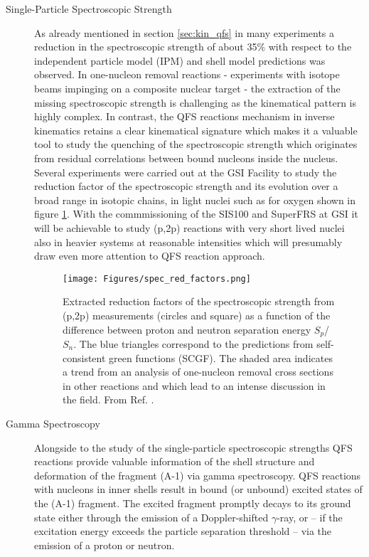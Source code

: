 \begin{description}
\item[Single-Particle Spectroscopic Strength]As already mentioned in section \ref{sec:kin_qfs} in many experiments a reduction in the spectroscopic strength of about 35\% with respect to the independent particle model (IPM) and shell model predictions was observed. In one-nucleon removal reactions - experiments with isotope beams impinging on a composite nuclear target - the extraction of the missing spectroscopic strength is challenging as the kinematical pattern is highly complex. In contrast, the QFS reactions mechanism in inverse kinematics retains a clear kinematical signature which makes it a valuable tool to study the quenching of the spectroscopic strength which originates from residual correlations between bound nucleons inside the nucleus. \newline
Several experiments were carried out at the GSI Facility to study the reduction factor of the spectroscopic strength  and its evolution over a broad range in isotopic chains, in light nuclei such as for oxygen shown in figure \ref{fig:red_factor}. With the commmissioning of the SIS100 and SuperFRS at GSI it will be achievable to study (p,2p) reactions with very short lived nuclei also in heavier systems at reasonable intensities which will presumably draw even more attention to QFS reaction approach.  
\begin{figure}[htpb]
    \centering
    \texttt{[image: Figures/spec\_red\_factors.png]}
    \caption{
   	Extracted reduction factors of the spectroscopic strength from (p,2p) measurements (circles and square) as a function of the difference between proton and neutron separation energy $S_p$/$S_n$. The blue triangles correspond to the predictions from self-consistent green functions (SCGF). The shaded area indicates a trend from an analysis of one-nucleon removal cross sections in other reactions and which lead to an intense discussion in the field. From Ref. \cite{atar2018quasifree}.   
    }
    \label{fig:red_factor}
\end{figure}
\item[Gamma Spectroscopy]Alongside to the study of the single-particle spectroscopic strengths QFS reactions provide valuable information of the shell structure and deformation of the fragment (A-1) via gamma spectroscopy. QFS reactions with nucleons in inner shells result in bound (or unbound) excited states of the (A-1) fragment. The excited fragment promptly decays to its ground state either through the emission of a Doppler-shifted \(\gamma\)-ray, or -- if the excitation energy exceeds the particle separation threshold -- via the emission of a proton or neutron.\newline

\end{description}

